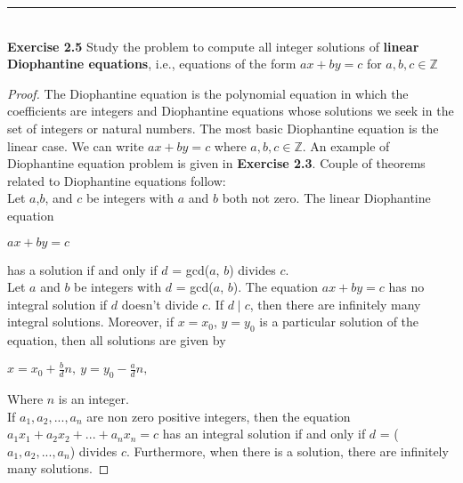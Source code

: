 \documentclass{article}
\begin{document}
\noindent\rule{12cm}{0.4pt}\\
\noindent \textbf{Exercise 2.5} Study the problem to compute all integer solutions of \textbf{linear Diophantine equations}, i.e., equations of the form $ax + by = c$ for $a, b, c \in \mathbb{Z}$
\begin{proof}
The Diophantine equation is the polynomial equation in which the coefficients are integers and Diophantine equations whose solutions we seek in the set of integers or natural numbers. The most basic Diophantine equation is the linear case. We can write $ax + by = c$ where $a, b, c \in \mathbb{Z}$. An example of Diophantine equation problem is given in \textbf{Exercise 2.3}. Couple of theorems related to Diophantine equations follow: \\
Let $a$,$b$, and $c$ be integers with $a$ and $b$ both not zero. The linear Diophantine equation
\begin{center}
$ax + by = c$
\end{center}
has a solution if and only if $d$ = gcd($a$, $b$) divides $c$.\\
Let $a$ and $b$ be integers with $d$ = gcd($a$, $b$). The equation $ax + by = c$ has no integral solution if $d$ doesn’t divide $c$. If $d \mid c$, then there are infinitely many integral solutions. Moreover, if $x = x_0$, $y = y_0$ is a particular solution of the equation, then all solutions are given by 
\begin{center}
$x = x_0 + \frac{b}{d}n,\ y=y_0 - \frac{a}{d}n,$
\end{center}
Where $n$ is an integer.\\
If $a_1, a_2,..., a_n$ are non zero positive integers, then the equation $a_1x_1 + a_2x_2 +...+ a_nx_n = c$ has an integral solution if and only if $d$ = ($a_1, a_2,..., a_n$) divides $c$. Furthermore, when there is a solution, there are infinitely many solutions.
\end{proof}
\end{document}
